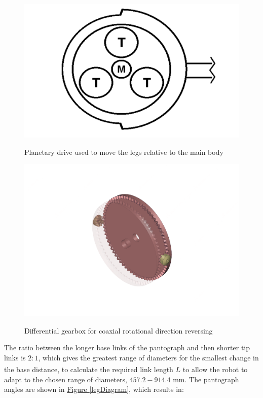 \documentclass[11pt]{article}		%
\newlength{\imageheight}	 %
\begin{document}
			\begin{figure}[h]
				\centering
				\begin{multicols}{2}
					\includegraphics[height=\imageheight]{planetaryDrive}
					\caption{Planetary drive used to move the legs relative to the main body}
					\label{planetaryDrive}
					\columnbreak
					\includegraphics[height=\imageheight]{diffGearbox}
					\caption{Differential gearbox for coaxial rotational direction reversing}
					\label{diffGearbox}
				\end{multicols}
			\end{figure}
			
			The ratio between the longer base links of the pantograph and then shorter tip links is $2:1$, which gives the greatest range of diameters for the smallest change in the base distance\textsuperscript{\cite{okada1987mogrer}}, to calculate the required link length $L$ to allow the robot to adapt to the chosen range of diameters, $457.2 - 914.4$ mm.
			The pantograph angles are shown in \hyperref[legDiagram]{Figure \ref*{legDiagram}}, which results in:
			
\end{document}
